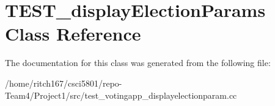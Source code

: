 \hypertarget{classTEST__displayElectionParams}{}\section{T\+E\+S\+T\+\_\+display\+Election\+Params Class Reference}
\label{classTEST__displayElectionParams}


The documentation for this class was generated from the following file\+:\begin{DoxyCompactItemize}
\item 
/home/ritch167/csci5801/repo-\/\+Team4/\+Project1/src/test\+\_\+votingapp\+\_\+displayelectionparam.\+cc\end{DoxyCompactItemize}
